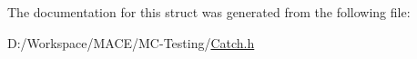 The documentation for this struct was generated from the following file\+:\begin{DoxyCompactItemize}
\item 
D\+:/\+Workspace/\+M\+A\+C\+E/\+M\+C-\/\+Testing/\hyperlink{_catch_8h}{Catch.\+h}\end{DoxyCompactItemize}

